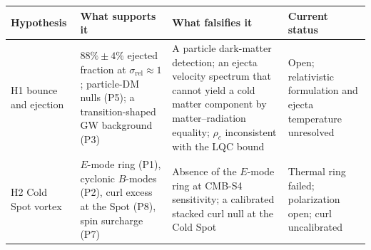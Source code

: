 \documentclass[
]{article}
\begin{document}
\begin{longtable}[]{@{}llll@{}}
\toprule
\begin{minipage}[b]{0.22\columnwidth}\raggedright
Hypothesis\strut
\end{minipage} & \begin{minipage}[b]{0.22\columnwidth}\raggedright
What supports it\strut
\end{minipage} & \begin{minipage}[b]{0.22\columnwidth}\raggedright
What falsifies it\strut
\end{minipage} & \begin{minipage}[b]{0.22\columnwidth}\raggedright
Current status\strut
\end{minipage}\tabularnewline
\midrule
\endhead
\begin{minipage}[t]{0.22\columnwidth}\raggedright
H1 bounce and ejection\strut
\end{minipage} & \begin{minipage}[t]{0.22\columnwidth}\raggedright
\(88\% \pm 4\%\) ejected fraction at \(\sigma_{\text{rel}} \approx 1\);
particle-DM nulls (P5); a transition-shaped GW background (P3)\strut
\end{minipage} & \begin{minipage}[t]{0.22\columnwidth}\raggedright
A particle dark-matter detection; an ejecta velocity spectrum that
cannot yield a cold matter component by matter--radiation equality;
\(\rho_c\) inconsistent with the LQC bound\strut
\end{minipage} & \begin{minipage}[t]{0.22\columnwidth}\raggedright
Open; relativistic formulation and ejecta temperature unresolved\strut
\end{minipage}\tabularnewline
\begin{minipage}[t]{0.22\columnwidth}\raggedright
H2 Cold Spot vortex\strut
\end{minipage} & \begin{minipage}[t]{0.22\columnwidth}\raggedright
\(E\)-mode ring (P1), cyclonic \(B\)-modes (P2), curl excess at the Spot
(P8), spin surcharge (P7)\strut
\end{minipage} & \begin{minipage}[t]{0.22\columnwidth}\raggedright
Absence of the \(E\)-mode ring at CMB-S4 sensitivity; a calibrated
stacked curl null at the Cold Spot\strut
\end{minipage} & \begin{minipage}[t]{0.22\columnwidth}\raggedright
Thermal ring failed; polarization open; curl uncalibrated\strut

\end{minipage}
\end{longtable}
\end{document}
